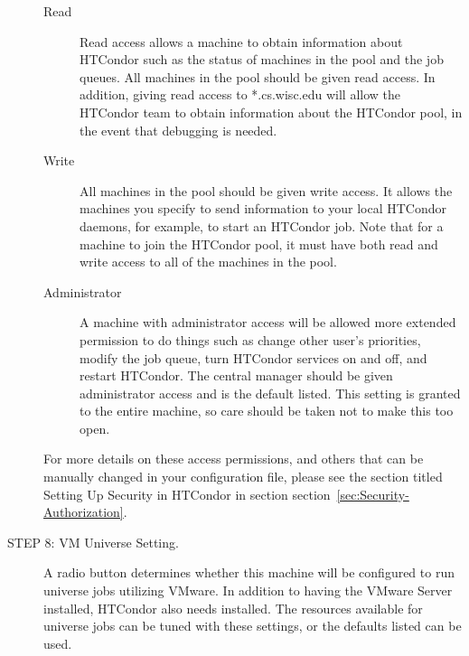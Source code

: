 \begin{description}
     \begin{description}
     \item[Read]
     Read access allows a machine to obtain information about
     HTCondor such as the status of machines in the pool and the job queues.
     All machines in the pool should be given read access. 
     In addition, giving read access to *.cs.wisc.edu 
     will allow the HTCondor team to obtain information about
     the HTCondor pool, in the event that debugging is needed.
     \item[Write]
     All machines in the pool should be given write access. 
     It allows the machines you specify to send information to your
     local HTCondor daemons, for example, to start an HTCondor job.
     Note that for a machine to join the HTCondor pool, 
     it must have both read and write access to all of the machines in the pool.
     \item[Administrator]
     A machine with administrator access will be allowed more
     extended permission to do things such as
     change other user's priorities, modify the job queue,
     turn HTCondor services on and off, and restart HTCondor.
     The central manager should be given administrator access
     and is the default listed.
     This setting is granted to the entire machine, 
     so care should be taken not to make this too open.
     \end{description}

     For more details on these access permissions, and others that can be
     manually changed in your configuration file, please
     see the section titled Setting Up Security in HTCondor
     in section section~\ref{sec:Security-Authorization}.

\item[STEP 8: VM Universe Setting.]
     A radio button determines whether 
     this machine will be configured to run  universe jobs 
     utilizing VMware.
     In addition to having the VMware Server installed, HTCondor also needs
      installed.
     The resources available for  universe jobs can be tuned 
     with these settings, or the defaults listed can be used.


\end{description}
